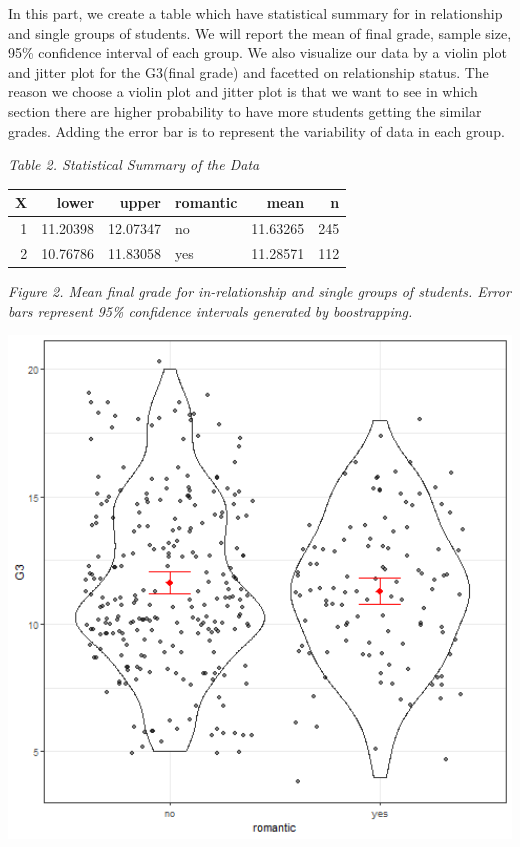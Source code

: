 \documentclass[]{article}
\begin{document}
In this part, we create a table which have statistical summary for in
relationship and single groups of students. We will report the mean of
final grade, sample size, 95\% confidence interval of each group. We
also visualize our data by a violin plot and jitter plot for the
G3(final grade) and facetted on relationship status. The reason we
choose a violin plot and jitter plot is that we want to see in which
section there are higher probability to have more students getting the
similar grades. Adding the error bar is to represent the variability of
data in each group.

\emph{Table 2. Statistical Summary of the Data}

\begin{longtable}[]{@{}rrrlrr@{}}
\toprule
X & lower & upper & romantic & mean & n\tabularnewline
\midrule
\endhead
1 & 11.20398 & 12.07347 & no & 11.63265 & 245\tabularnewline
2 & 10.76786 & 11.83058 & yes & 11.28571 & 112\tabularnewline
\bottomrule
\end{longtable}

\emph{Figure 2. Mean final grade for in-relationship and single groups
of students. Error bars represent 95\% confidence intervals generated by
boostrapping.}

\includegraphics[width=6.67in]{../results/CI_plot}
\end{document}
